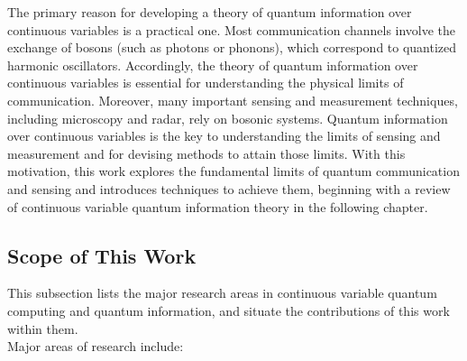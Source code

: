 The primary reason for developing a theory of quantum information over continuous variables is a practical one. Most communication channels involve the exchange of bosons (such as photons or phonons), which correspond to quantized harmonic oscillators. Accordingly, the theory of quantum information over continuous variables is essential for understanding the physical limits of communication. Moreover, many important sensing and measurement techniques, including microscopy and radar, rely on bosonic systems. Quantum information over continuous variables is the key to understanding the limits of sensing and measurement and for devising methods to attain those limits. With this motivation, this work explores the fundamental limits of quantum communication and sensing and introduces techniques to achieve them, beginning with a review of continuous variable quantum information theory in the following chapter.

\subsection{Scope of This Work}
This subsection lists the major research areas in continuous variable quantum computing and quantum information, and situate the contributions of this work within them.\\

Major areas of research include:

